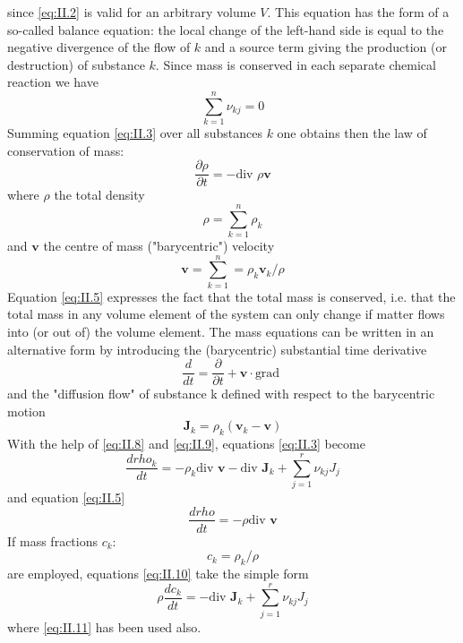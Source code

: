 since \eqref{eq:II.2} is valid for an arbitrary volume $V$. This equation has the form of a so-called balance equation: the local change of the left-hand side is equal to the negative divergence of the flow of $k$ and a source term giving the production (or destruction) of substance $k$. Since mass is conserved in each separate chemical reaction we have
\begin{equation}
\sum_{k=1}^{n} \nu_{kj} = 0
    \label{eq:II.4}
\end{equation}
Summing equation \eqref{eq:II.3} over all substances $k$ one obtains then the law of conservation of mass:
\begin{equation}
\frac{\partial \rho}{\partial t} = - \textrm{div } \rho \bm{v}
    \label{eq:II.5}
\end{equation}
where $\rho$ the total density
\begin{equation}
    \rho = \sum_{k=1}^{n} \rho_k
    \label{eq:II.6}
\end{equation}
and $\bm{v}$ the centre of mass ("barycentric") velocity
\begin{equation}
\bm{v} = \sum_{k=1}^{n} = \rho_k \bm{v}_k / \rho
    \label{eq:II.7}
\end{equation}
Equation \eqref{eq:II.5} expresses the fact that the total mass is conserved, i.e. that the total mass in any volume element of the system can only change if matter flows into (or out of) the volume element.
The mass equations can be written in an alternative form by introducing
the (barycentric) substantial time derivative
\begin{equation}
\frac{d}{d t} = \frac{\partial }{\partial t} + \bm{v} \cdot \textrm{grad }
    \label{eq:II.8}
\end{equation}
and the "diffusion flow" of substance k defined with respect to the
barycentric motion
\begin{equation}
\bm{J}_k = \rho_k \left( \bm{v}_k - \bm{v} \right)
    \label{eq:II.9}
\end{equation}
With the help of \eqref{eq:II.8} and \eqref{eq:II.9}, equations \eqref{eq:II.3} become
\begin{equation}
\frac{d rho_k}{d t} = - \rho_k \textrm{div } \bm{v} - \textrm{div } \bm{J}_k + \sum_{j=1}^r \nu_{kj} J_j
    \label{eq:II.10}
\end{equation}
and equation \eqref{eq:II.5}
\begin{equation}
\frac{d rho}{d t} = - \rho \textrm{div } \bm{v}
    \label{eq:II.11}
\end{equation}
If mass fractions $c_k$:
\begin{equation}
    c_k = \rho_k / \rho
    \label{eq:II.12}
\end{equation}
are employed, equations \eqref{eq:II.10} take the simple form
\begin{equation}
    \rho \frac{d c_k}{d t} = - \textrm{div } \bm{J}_k + \sum_{j=1}^r \nu_{kj} J_j
    \label{eq:II.13}
\end{equation}
where \eqref{eq:II.11} has been used also.

